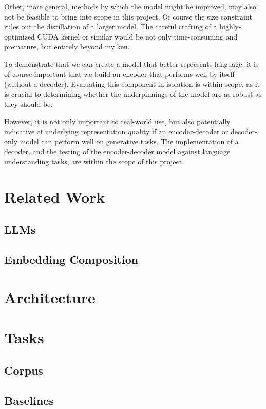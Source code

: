 \documentclass[a4paper, 12pt]{article}
\begin{document}
Other, more general, methods by which the model might be improved, may also not be feasible to bring into scope in this project. Of course the size constraint rules out the distillation of a larger model. The careful crafting of a highly-optimized CUDA kernel or similar would be not only time-consuming and premature, but entirely beyond my ken.

To demonstrate that we can create a model that better represents language, it is of course important that we build an encoder that performs well by itself (without a decoder). Evaluating this component in isolation is within scope, as it is crucial to determining whether the underpinnings of the model are as robust as they should be.

However, it is not only important to real-world use, but also potentially indicative of underlying representation quality if an encoder-decoder or decoder-only model can perform well on generative tasks. The implementation of a decoder, and the testing of the encoder-decoder model against language understanding tasks, are within the scope of this project.

\section{Related Work}

\subsection{LLMs}

\subsection{Embedding Composition}

\section{Architecture}

\section{Tasks}

\subsection{Corpus}

\subsection{Baselines}
\end{document}
